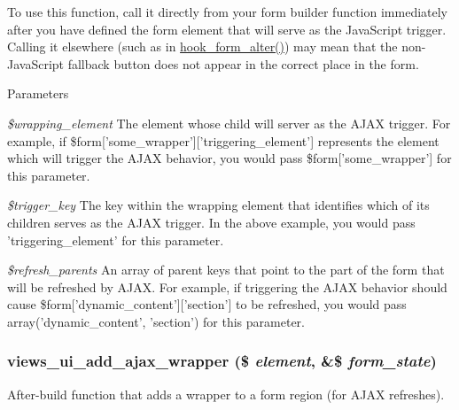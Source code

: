 To use this function, call it directly from your form builder function immediately after you have defined the form element that will serve as the JavaScript trigger. Calling it elsewhere (such as in \hyperlink{group__hooks_ga6df3cea27ae1407aeef4eae5444cb213}{hook\_\-form\_\-alter()}) may mean that the non-\/JavaScript fallback button does not appear in the correct place in the form.


\begin{DoxyParams}{Parameters}
\item[{\em \$wrapping\_\-element}]The element whose child will server as the AJAX trigger. For example, if \$form\mbox{[}'some\_\-wrapper'\mbox{]}\mbox{[}'triggering\_\-element'\mbox{]} represents the element which will trigger the AJAX behavior, you would pass \$form\mbox{[}'some\_\-wrapper'\mbox{]} for this parameter. \item[{\em \$trigger\_\-key}]The key within the wrapping element that identifies which of its children serves as the AJAX trigger. In the above example, you would pass 'triggering\_\-element' for this parameter. \item[{\em \$refresh\_\-parents}]An array of parent keys that point to the part of the form that will be refreshed by AJAX. For example, if triggering the AJAX behavior should cause \$form\mbox{[}'dynamic\_\-content'\mbox{]}\mbox{[}'section'\mbox{]} to be refreshed, you would pass array('dynamic\_\-content', 'section') for this parameter. \end{DoxyParams}
\hypertarget{admin_8inc_a5c7fbab40819d08a0223ac25532cc82c}{
\subsubsection[{views\_\-ui\_\-add\_\-ajax\_\-wrapper}]{\setlength{\rightskip}{0pt plus 5cm}views\_\-ui\_\-add\_\-ajax\_\-wrapper (\$ {\em element}, \/  \&\$ {\em form\_\-state})}}
\label{admin_8inc_a5c7fbab40819d08a0223ac25532cc82c}
After-\/build function that adds a wrapper to a form region (for AJAX refreshes).

